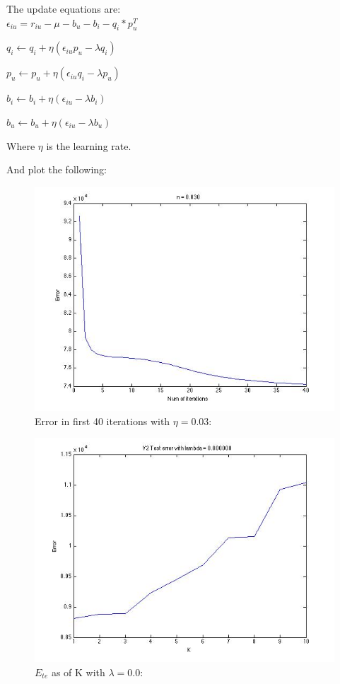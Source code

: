 \documentclass{article}
\begin{document}
The update equations are:\\
$\epsilon_{iu} = r_{iu} - \mu - b_u - b_i - q_i * p_u^T$

$q_i \leftarrow q_i + \eta(\epsilon_{iu}p_u - \lambda q_i)$

$p_u \leftarrow p_u + \eta(\epsilon_{iu}q_i - \lambda p_u)$

$b_i \leftarrow b_i + \eta(\epsilon_{iu} - \lambda b_i)$

$b_u \leftarrow b_u + \eta(\epsilon_{iu} - \lambda b_u)$

Where $\eta$ is the learning rate.

And plot the following:\\

\begin{figure}[H]
\centering
\includegraphics[scale=0.5]{EAsOfK-V2.jpg}
\caption{ Error in first 40 iterations with $\eta=0.03$: }
\label{}
\end{figure}

\begin{figure}[H]
\centering
\includegraphics[scale=0.5]{TestErrorLambda0-V2.jpg}
\caption{ $E_{te}$ as of K with $\lambda=0.0$:}
\label{}
\end{figure}
\end{document}
